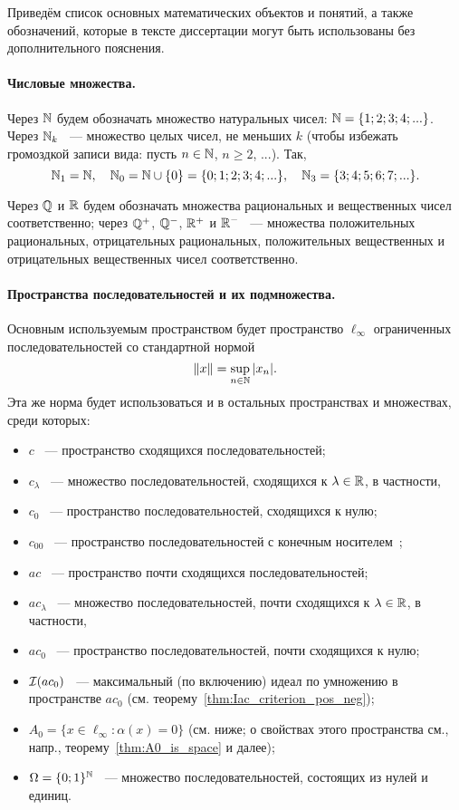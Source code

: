 Приведём список основных математических объектов и понятий,
а также обозначений, которые в тексте диссертации могут быть использованы без дополнительного пояснения.


\paragraph{Числовые множества.}
Через $\mathbb{N}$ будем обозначать множество натуральных чисел: $\mathbb{N} = \{1;2;3;4;...\}$.
Через $\mathbb{N}_k$ ~--- множество целых чисел, не меньших $k$ (чтобы избежать громоздкой записи вида: пусть $n\in \mathbb{N}$, $n \geq 2$, ...).
Так,
\begin{equation}
	\mathbb{N}_1 = \mathbb{N}
	,
	\quad
	\mathbb{N}_0 = \mathbb{N} \cup\{0\} = \{0;1;2;3;4;...\}
	,
	\quad
	\mathbb{N}_3 = \{3;4;5;6;7;...\}
	.
\end{equation}

Через $\mathbb{Q}$ и $\mathbb{R}$ будем обозначать множества рациональных и вещественных чисел соответственно;
через $\mathbb{Q}^+$, $\mathbb{Q}^-$, $\mathbb{R}^+$ и $\mathbb{R}^-$ ~--- множества положительных рациональных, отрицательных рациональных,
положительных вещественных и отрицательных вещественных чисел соответственно.

\paragraph{Пространства последовательностей и их подмножества.}

Основным используемым пространством будет пространство $\ell_\infty$ ограниченных последовательностей со стандартной нормой
\begin{equation}
	\|x\| = \sup_{n\in\mathbb{N}} |x_n|
	.
\end{equation}
Эта же норма будет использоваться и в остальных пространствах и множествах, среди которых:
\begin{itemize}
	\item
		$c$ ~--- пространство сходящихся последовательностей;
	\item
		$c_\lambda$ ~--- множество последовательностей, сходящихся к $\lambda \in \mathbb{R}$, в частности,
	\item
		$c_0$ ~--- пространство последовательностей, сходящихся к нулю;
	\item
		$c_{00}$ ~--- пространство последовательностей с конечным носителем~\cite[теорема 4]{ASSU2};
	\item
		$ac$ ~--- пространство почти сходящихся последовательностей;
	\item
		$ac_\lambda$ ~--- множество последовательностей, почти сходящихся к $\lambda \in \mathbb{R}$, в частности,
	\item
		$ac_0$ ~--- пространство последовательностей, почти сходящихся к нулю;
	\item
		$\mathcal{I}(ac_0)$ ~--- максимальный (по включению) идеал по умножению в пространстве $ac_0$ (см. теорему~\ref{thm:Iac_criterion_pos_neg});
	\item
		$A_0 = \{ x\in\ell_\infty : \alpha(x) = 0\}$ (см. ниже; о свойствах этого пространства см., напр., теорему~\ref{thm:A0_is_space} и далее);
	\item
		$\Omega = \{0;1\}^{\mathbb{N}}$ ~--- множество последовательностей, состоящих из нулей и единиц.
\end{itemize}



